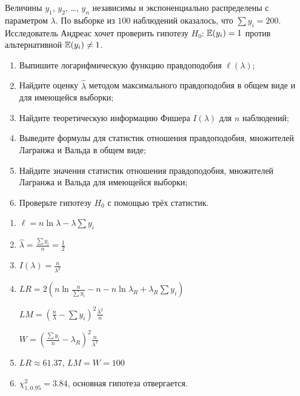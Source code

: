 \begin{problem}
  Величины $y_1$, $y_2$, \ldots, $y_n$ независимы и экспоненциально распределены с параметром $\lambda$. По выборке из $100$ наблюдений оказалось, что $\sum y_i=200$. Исследователь Андреас хочет проверить гипотезу $H_0$: $\operatorname{\mathbb{E}}(y_i)=1$ против альтернативной $\operatorname{\mathbb{E}}(y_i)\neq 1$.

\begin{enumerate}
  \item Выпишите логарифмическую функцию правдоподобия $\ell(\lambda)$;
  \item Найдите оценку $\hat \lambda$ методом максимального правдоподобия
    в общем виде и для имеющейся выборки;
  \item Найдите теоретическую информацию Фишера $I(\lambda)$ для $n$ наблюдений;
  \item Выведите формулы для статистик отношения правдоподобия, множителей Лагранжа и Вальда в общем виде;
  \item Найдите значения статистик отношения правдоподобия, множителей Лагранжа и Вальда для имеющейся выборки;
  \item Проверьте гипотезу $H_0$ с помощью трёх статистик.
\end{enumerate}
\begin{sol}
\begin{enumerate}
\item $\ell = n \ln \lambda - \lambda \sum y_i$
\item $\hat \lambda = \frac{\sum y_i}{n} = \frac{1}{2}$
\item $I(\lambda)=\frac{n}{\lambda^2}$
\item $LR = 2(n \ln \frac{n}{\sum y_i} - n - n \ln \lambda_R + \lambda_R \sum y_i)$

$LM = \left(\frac{n}{\lambda} - \sum y_i \right)^2 \frac{\lambda^2}{n}$

$W = \left(\frac{\sum y_i}{n} - \lambda_R \right)^2 \frac{n}{\lambda^2}$
\item $LR \approx 61.37$, $LM = W = 100$
\item $\chi^2_{1, 0.95} = 3.84$, основная гипотеза отвергается.
\end{enumerate}
\end{sol}
\end{problem}



